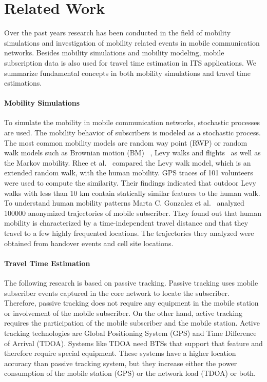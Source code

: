 \documentclass[twocolumn]{bmcart}%
\begin{document}
\section*{Related Work}
Over the past years research has been conducted in the field of mobility simulations and investigation of mobility related events in mobile communication networks. Besides mobility simulations and mobility modeling, mobile subscription data is also used for travel time estimation in ITS applications. We summarize fundamental concepts in both mobility simulations and travel time estimations.
\paragraph*{Mobility Simulations}
To simulate the mobility in mobile communication networks, stochastic processes are used. The mobility behavior of subscribers is modeled as a stochastic process. The most common mobility models are random way point (RWP) or random walk models such as Brownian motion (BM)~\cite{Klafter1996} , Levy walks and flights~\cite{Camp2002} as well as the Markov mobility\cite{Bai2004}.
Rhee et al.~\cite{Rhee2011} compared the Levy walk model, which is an extended random walk, with the human mobility. GPS traces of 101 volunteers were used to compute the similarity. Their findings indicated that outdoor Levy walks with less than 10 km contain statically similar features to the human walk.
To understand human mobility patterns Marta C. Gonzalez et al.~\cite{Gonzalez2008} analyzed 100000 anonymized trajectories of mobile subscriber. They found out that human mobility is characterized by a time-independent travel distance and that they travel to a few highly frequented locations. The trajectories they analyzed were obtained from handover events and cell site locations. 
\paragraph*{Travel Time Estimation}
The following research is based on passive tracking. Passive tracking uses mobile subscriber events captured in the core network to locate the subscriber. Therefore, passive tracking does not require any equipment in the mobile station or involvement of the mobile subscriber. On the other hand, active tracking requires the participation of the mobile subscriber and the mobile station. Active tracking technologies are Global Positioning System (GPS) and Time Difference of Arrival (TDOA). Systems like TDOA need BTSs that support that feature and therefore require special equipment. These systems have a higher location accuracy than passive tracking system, but they increase either the power consumption of the mobile station (GPS) or the network load (TDOA) or both.\newline
\end{document}
